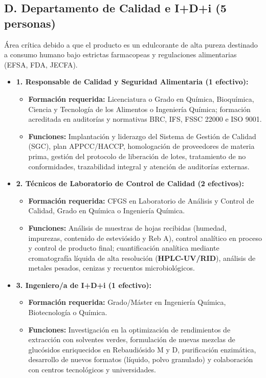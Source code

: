 \subsection{D. Departamento de Calidad e I+D+i (5 personas)}

Área crítica debido a que el producto es un edulcorante de alta pureza destinado a consumo humano bajo estrictas farmacopeas y regulaciones alimentarias (EFSA, FDA, JECFA).

\begin{itemize}[leftmargin=*]
    \item \textbf{1. Responsable de Calidad y Seguridad Alimentaria (1 efectivo):}
          \begin{itemize}
              \item \textbf{Formación requerida:} Licenciatura o Grado en Química, Bioquímica, Ciencia y Tecnología de los Alimentos o Ingeniería Química; formación acreditada en auditorías y normativas BRC, IFS, FSSC 22000 e ISO 9001.
              \item \textbf{Funciones:} Implantación y liderazgo del Sistema de Gestión de Calidad (SGC), plan APPCC/HACCP, homologación de proveedores de materia prima, gestión del protocolo de liberación de lotes, tratamiento de no conformidades, trazabilidad integral y atención de auditorías externas.
          \end{itemize}

    \item \textbf{2. Técnicos de Laboratorio de Control de Calidad (2 efectivos):}
          \begin{itemize}
              \item \textbf{Formación requerida:} CFGS en Laboratorio de Análisis y Control de Calidad, Grado en Química o Ingeniería Química.
              \item \textbf{Funciones:} Análisis de muestras de hojas recibidas (humedad, impurezas, contenido de esteviósido y Reb A), control analítico en proceso y control de producto final; cuantificación analítica mediante cromatografía líquida de alta resolución (\textbf{HPLC-UV/RID}), análisis de metales pesados, cenizas y recuentos microbiológicos.
          \end{itemize}

    \item \textbf{3. Ingeniero/a de I+D+i (1 efectivo):}
          \begin{itemize}
              \item \textbf{Formación requerida:} Grado/Máster en Ingeniería Química, Biotecnología o Química.
              \item \textbf{Funciones:} Investigación en la optimización de rendimientos de extracción con solventes verdes, formulación de nuevas mezclas de glucósidos enriquecidos en Rebaudiósido M y D, purificación enzimática, desarrollo de nuevos formatos (líquido, polvo granulado) y colaboración con centros tecnológicos y universidades.
          \end{itemize}


\end{itemize}

